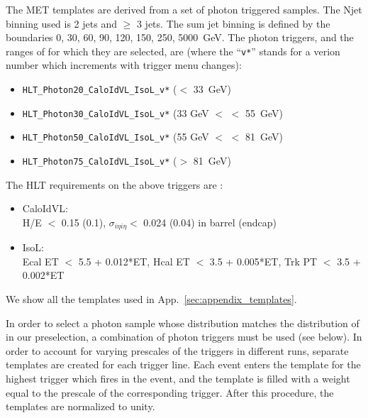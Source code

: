 The MET templates are derived from a set of photon triggered samples. 
The Njet binning used is 2 jets and $\ge$ 3 jets. 
The sum jet \pt binning is defined by the boundaries {0, 30, 60, 90, 120, 150, 250, 5000}~GeV.
The photon triggers, and the ranges of \Z \pt for which they are selected, are (where the ``\verb=v*='' stands for a verion number which increments with trigger menu changes):

\begin{itemize}
\item \verb=HLT_Photon20_CaloIdVL_IsoL_v*= (\Z \pt $<$ 33~GeV)
\item \verb=HLT_Photon30_CaloIdVL_IsoL_v*= (33 GeV $<$ \Z \pt $<$ 55~GeV)
\item \verb=HLT_Photon50_CaloIdVL_IsoL_v*= (55 GeV $<$ \Z \pt $<$ 81~GeV)
\item \verb=HLT_Photon75_CaloIdVL_IsoL_v*= (\Z \pt $>$ 81~GeV)
\end{itemize}

The HLT requirements on the above triggers are \cite{ref:eghlt}:

\begin{itemize}
\item CaloIdVL: \\
  H/E $<$ 0.15 (0.1), $\sigma_{i\eta i\eta} <$ 0.024 (0.04) in barrel (endcap)
\item IsoL: \\
  Ecal ET $<$ 5.5 + 0.012*ET, %
  Hcal ET $<$ 3.5 + 0.005*ET, %
  Trk PT $<$ 3.5 + 0.002*ET 
\end{itemize}




We show all the templates used in App.~\ref{sec:appendix_templates}.


In order to select a photon sample whose \pt distribution matches the distribution of \Z \pt
 in our preselection, a combination of photon triggers must be used (see below). 
In order to account for varying prescales of the triggers in different runs,
 separate templates are created for each trigger line. 
Each event enters the template for the highest \pt trigger which fires in the event,
 and the template is filled with a weight equal to the prescale of the corresponding trigger.
After this procedure, the templates are normalized to unity.
